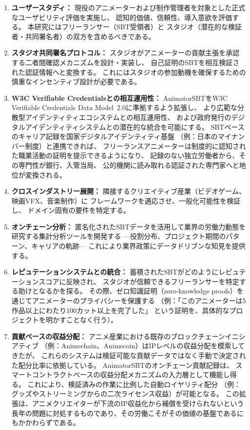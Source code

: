 \begin{enumerate}
  \item \textbf{ユーザースタディ：}
    現役のアニメーターおよび制作管理者を対象とした正式なユーザビリティ評価を実施し、
    認知的価値、信頼性、導入意欲を評価する。
    本研究にはフリーランサー（SBT受領者）と
    スタジオ（潜在的な検証者・共同署名者）の双方を含めるべきである。

  \item \textbf{スタジオ共同署名プロトコル：}
    スタジオがアニメーターの貢献主張を承認する二者間確認メカニズムを設計・実装し、
    自己証明のSBTを相互検証された認証情報へと変換する。
    これにはスタジオの参加動機を確保するための慎重なインセンティブ設計が必要である。

  \item \textbf{W3C Verifiable Credentialsとの相互運用性：}
    AnimatorSBTをW3C Verifiable Credentials Data Model~2.0に準拠するよう拡張し、
    より広範な分散型アイデンティティエコシステムとの相互運用性、
    および政府発行のデジタルアイデンティティシステムとの潜在的な統合を可能にする。
    SBTベースのキャリア記録を国家デジタルアイデンティティ基盤
    （例：日本のマイナンバー制度）と連携できれば、
    フリーランスアニメーターは制度的に認知された職業活動の証明を提示できるようになり、
    記録のない独立労働者から、その専門性が銀行、入管当局、
    公的機関に読み取れる認証された専門家へと地位が変換される。

  \item \textbf{クロスインダストリー展開：}
    隣接するクリエイティブ産業（ビデオゲーム、映画VFX、音楽制作）に
    フレームワークを適応させ、一般化可能性を検証し、
    ドメイン固有の要件を特定する。

  \item \textbf{オンチェーン分析：}
    匿名化されたSBTデータを活用して業界の労働力動態を研究する集計分析ツールを開発する
    ---役割分布、プロジェクト期間のパターン、キャリアの軌跡---
    これにより業界政策にデータドリブンな知見を提供する。

  \item \textbf{レピュテーションシステムとの統合：}
    蓄積されたSBTがどのようにレピュテーションスコアに反映され、
    スタジオが信頼できるフリーランサーを特定する助けとなるかを探る。
    その際、ゼロ知識証明（zero-knowledge proofs）を通じてアニメーターのプライバシーを保護する
    （例：「このアニメーターは5作品以上にわたり100カット以上を完了した」
    という証明を、具体的なプロジェクトを明かすことなく行う）。

  \item \textbf{貢献ベースの収益分配：}
    アニメ産業における既存のブロックチェーンイニシアティブ
    （例：Animechain、Animecoin）はIPレベルの収益分配を模索してきたが、
    これらのシステムは検証可能な貢献データではなく手動で決定された配分比率に依拠している。
    AnimatorSBTのオンチェーン貢献記録は、
    スマートコントラクトベースの収益分配メカニズムの入力層として機能し得る。
    これにより、検証済みの作業に比例した自動ロイヤリティ配分
    （例：グッズやストリーミングからの二次ライセンス収益）が可能となる。
    この拡張は、アニメクリエイターが下流のIP収益化から補償を受けられないという
    長年の問題に対処するものであり、その労働こそがその価値の基盤であるにもかかわらずである。
\end{enumerate}

